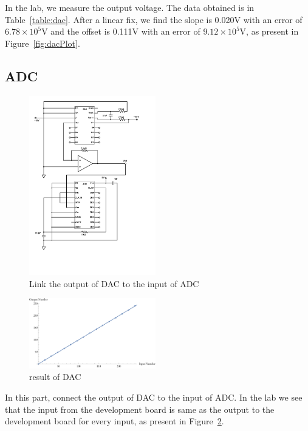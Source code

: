 \documentclass[aps,prl,reprint]{revtex4-1}
\begin{document}
        In the lab, we measure the output voltage. The data obtained is in Table~\ref{table:dac}. After a linear fix, we find the slope is 0.020V with an error of $6.78\times 10^5$V and the offset is 0.111V with an error of $9.12\times 10^5$V, as present in Figure~\ref{fig:dacPlot}.
    \subsection{ADC}
        \begin{figure}[h]
            \centering
            \includegraphics[width=0.49\textwidth]{image/DAC-ADC.pdf}
            \caption{Link the output of DAC to the input of ADC}
            \label{fig:adc}
        \end{figure}
        \begin{figure}[h]
            \centering
            \includegraphics[width=0.49\textwidth]{image/plot2.pdf}
            \caption{result of DAC}
            \label{fig:adcPlot}
        \end{figure}
        In this part, connect the output of DAC to the input of ADC. In the lab we see that the input from the development board is same as the output to the development board for every input, as present in Figure~\ref{fig:adcPlot}.
\end{document}
